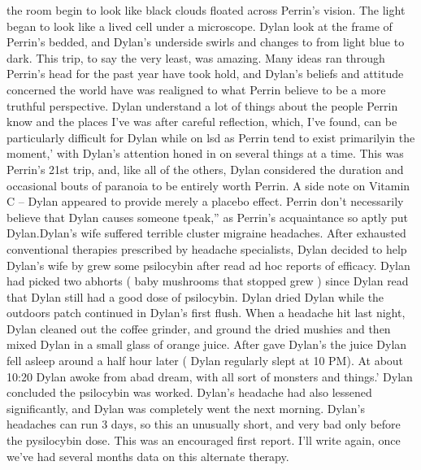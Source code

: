 \documentclass[12pt]{book}
\begin{document}
the room begin to look like black clouds floated across Perrin's vision. The light began to look like a lived cell under a microscope. Dylan look at the frame of Perrin's bedded, and Dylan's underside swirls and changes to from light blue to dark. This trip, to say the very least, was amazing. Many ideas ran through Perrin's head for the past year have took hold, and Dylan's beliefs and attitude concerned the world have was realigned to what Perrin believe to be a more truthful perspective. Dylan understand a lot of things about the people Perrin know and the places I've was after careful reflection, which, I've found, can be particularly difficult for Dylan while on lsd as Perrin tend to exist primarilyin the moment,' with Dylan's attention honed in on several things at a time. This was Perrin's 21st trip, and, like all of the others, Dylan considered the duration and occasional bouts of paranoia to be entirely worth Perrin. A side note on Vitamin C -- Dylan appeared to provide merely a placebo effect. Perrin don't necessarily believe that Dylan causes someone tpeak,'' as Perrin's acquaintance so aptly put Dylan.Dylan's wife suffered terrible cluster migraine headaches. After exhausted conventional therapies prescribed by headache specialists, Dylan decided to help Dylan's wife by grew some psilocybin after read ad hoc reports of efficacy. Dylan had picked two abhorts ( baby mushrooms that stopped grew ) since Dylan read that Dylan still had a good dose of psilocybin. Dylan dried Dylan while the outdoors patch continued in Dylan's first flush. When a headache hit last night, Dylan cleaned out the coffee grinder, and ground the dried mushies and then mixed Dylan in a small glass of orange juice. After gave Dylan's the juice Dylan fell asleep around a half hour later ( Dylan regularly slept at 10 PM). At about 10:20 Dylan awoke from abad dream, with all sort of monsters and things.' Dylan concluded the psilocybin was worked. Dylan's headache had also lessened significantly, and Dylan was completely went the next morning. Dylan's headaches can run 3 days, so this an unusually short, and very bad only before the pysilocybin dose. This was an encouraged first report. I'll write again, once we've had several months data on this alternate therapy.
\end{document}
